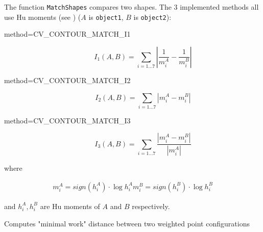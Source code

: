 \begin{description}
\end{description}

The function \texttt{MatchShapes} compares two shapes. The 3 implemented methods all use Hu moments (see ) ($A$ is \texttt{object1}, $B$ is \texttt{object2}):

\begin{description}
\item[method=CV\_CONTOUR\_MATCH\_I1]
\[ I_1(A,B) = \sum_{i=1...7} \left| \frac{1}{m^A_i} - \frac{1}{m^B_i} \right| \]

\item[method=CV\_CONTOUR\_MATCH\_I2]
\[ I_2(A,B) = \sum_{i=1...7} \left| m^A_i - m^B_i \right| \]

\item[method=CV\_CONTOUR\_MATCH\_I3]
\[ I_3(A,B) = \sum_{i=1...7} \frac{ \left| m^A_i - m^B_i \right| }{ \left| m^A_i \right| } \]
\end{description}

where

\[
\begin{array}{l}
m^A_i = sign(h^A_i) \cdot \log{h^A_i}
m^B_i = sign(h^B_i) \cdot \log{h^B_i}
\end{array}
\]

and $h^A_i, h^B_i$ are Hu moments of $A$ and $B$ respectively.

\label{CalcEMD2}

Computes "minimal work" distance between two weighted point configurations


